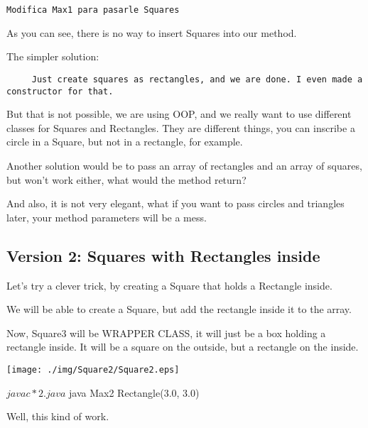 \documentclass[a4paper, 9pt]{extarticle}
\begin{document}
\verb+Modifica Max1 para pasarle Squares+

As you can see, there is no way to insert Squares into our method.

The simpler solution:

\verb+     Just create squares as rectangles, and we are done. I even made a constructor for that.+

But that is not possible, we are using OOP, and we really want to use different
classes for Squares and Rectangles. They are different things, you can inscribe
a circle in a Square, but not in a rectangle, for example.



Another solution would be to pass an array of rectangles and an array of
squares, but won't work either, what would the method return?

And also, it is not very elegant, what if you want to pass circles and
triangles later, your method parameters will be a mess.










\newpage
\subsection{Version 2: Squares with Rectangles inside}

Let's try a clever trick, by creating a Square that holds a Rectangle inside.

We will be able to create a Square, but add the rectangle inside it to the
array.

Now, Square3 will be WRAPPER CLASS, it will just be a box holding a rectangle
inside. It will be a square on the outside, but a rectangle on the inside.

\begin{multicols}{2}
  \begin{center}
    \texttt{[image: ./img/Square2/Square2.eps]}
  \end{center}
\columnbreak
\end{multicols}

\begin{blackboard}
$ javac *2.java
$ java Max2
Rectangle(3.0, 3.0)
\end{blackboard}

Well, this kind of work.
\end{document}
